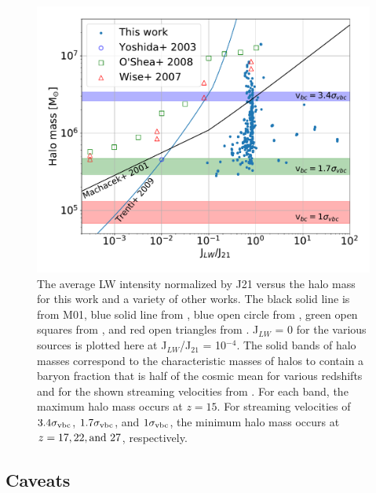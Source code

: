 \documentclass[a4paper,fleqn,usenatbib]{mnras}
\begin{document}
\begin{figure}
	\includegraphics[width=\columnwidth]{images/compare_JLW_mass.pdf}
    \caption{The average LW intensity normalized by J21 versus the halo mass for this work and a variety of other works. The black solid line is from M01, blue solid line from \citet{Trenti09_SFR}, blue open circle from \citet{Yoshida03}, green open squares from \citet{OShea08}, and red open triangles from \citet{Wise07_UVB}. J$_{LW}$ = 0 for the various sources is plotted here at J$_{LW}$/J$_{21}$ = 10$^{-4}$. The solid bands of halo masses correspond to the characteristic masses of halos to contain a baryon fraction that is half of the cosmic mean for various redshifts and for the shown streaming velocities from \citet{Naoz13}. For each band, the maximum halo mass occurs at $z = 15$. For streaming velocities of $3.4 \sigma_{\rm vbc}$, $1.7 \sigma_{\rm vbc}$, and $1 \sigma_{\rm vbc}$, the minimum halo mass occurs at $z = 17, 22, \rm{and} \ 27$, respectively.}
    \label{fig:compare_JLW_mass}
\end{figure}

\subsection{Caveats}
\end{document}
